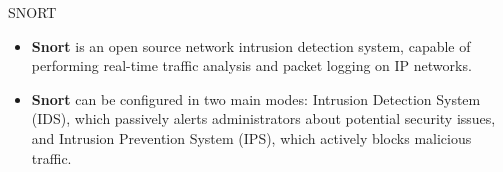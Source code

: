 \begin{frame}[t]{SNORT}
  \fontsize{17}{20.5}\selectfont
  \vspace{0.15cm}
  \begin{itemize}
    \item \textbf{Snort} is an open source network intrusion detection system, capable of performing real-time traffic analysis and packet logging on IP networks.
    \item \textbf{Snort} can be configured in two main modes: Intrusion Detection System (IDS), which passively alerts administrators about potential security issues, and Intrusion Prevention System (IPS), which actively blocks malicious traffic.
  \end{itemize}
\end{frame}
